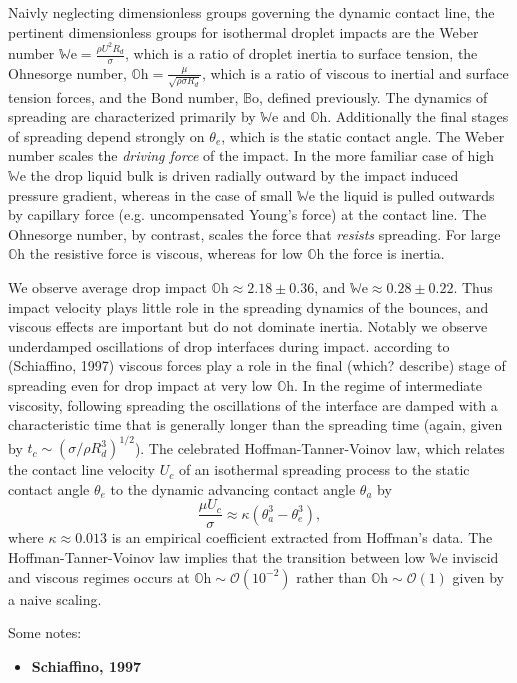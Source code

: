 \documentclass[10pt,a4paper]{article}
\begin{document}
Naivly neglecting dimensionless groups governing the dynamic contact line, the pertinent dimensionless groups for isothermal droplet impacts are the Weber number $\mathbb{W}\mbox{e} = \frac{\rho U^2 R_d}{\sigma}$, which is a ratio of droplet inertia to surface tension, the Ohnesorge number, $\mathbb{O}\mbox{h} = \frac{\mu}{\sqrt{\rho \sigma R_d}}$, which is a ratio of viscous to inertial and surface tension forces, and the Bond number, $\mathbb{B}\mbox{o}$, defined previously. The dynamics of spreading are characterized primarily by $\mathbb{W}\mbox{e}$ and $\mathbb{O}\mbox{h}$. Additionally the final stages of spreading depend strongly on $\theta_e$, which is the static contact angle. The Weber number scales the \emph{driving force} of the impact. In the more familiar case of high $\mathbb{W}\mbox{e}$ the drop liquid bulk is driven radially outward by the impact induced pressure gradient, whereas in the case of small $\mathbb{W}\mbox{e}$ the liquid is pulled outwards by capillary force (e.g. uncompensated Young's force) at the contact line. The Ohnesorge number, by contrast, scales the force that \emph{resists} spreading. For large $\mathbb{O}\mbox{h}$ the resistive force is viscous, whereas for low $\mathbb{O}\mbox{h}$ the force is inertia.

We observe average drop impact $\mathbb{O}\mbox{h} \approx 2.18 \pm 0.36$, and  $\mathbb{W}\mbox{e} \approx 0.28 \pm 0.22$. Thus impact velocity plays little role in the spreading dynamics of the bounces, and viscous effects are important but do not dominate inertia. Notably we observe underdamped oscillations of drop interfaces during impact. according to (Schiaffino, 1997) viscous forces play a role in the final (which? describe) stage of spreading even for drop impact at very low $\mathbb{O}\mbox{h}$. In the regime of intermediate viscosity, following spreading the oscillations of the interface are damped with a characteristic time that is generally longer than the spreading time (again, given by $t_c \sim \left( \sigma / \rho R_d^3 \right)^{1/2}$). The celebrated Hoffman-Tanner-Voinov law, which relates the contact line velocity $U_c$ of an isothermal spreading process to the static contact angle $\theta_e$ to the dynamic advancing contact angle $\theta_a$ by
\[
\frac{\mu U_c}{\sigma} \approx \kappa \left( \theta_a^3 - \theta_e^3 \right),
\]
where $\kappa \approx 0.013$ is an empirical coefficient extracted from Hoffman's data. The Hoffman-Tanner-Voinov law implies that the transition between low $\mathbb{W}\mbox{e}$ inviscid and viscous regimes occurs at $\mathbb{O}\mbox{h} \sim \mathcal{O}(10^{-2})$ rather than $\mathbb{O}\mbox{h} \sim \mathcal{O}(1)$ given by a naive scaling.

Some notes:
\begin{itemize}
\item{\textbf{Schiaffino, 1997}} 
\end{itemize}

\end{document}
